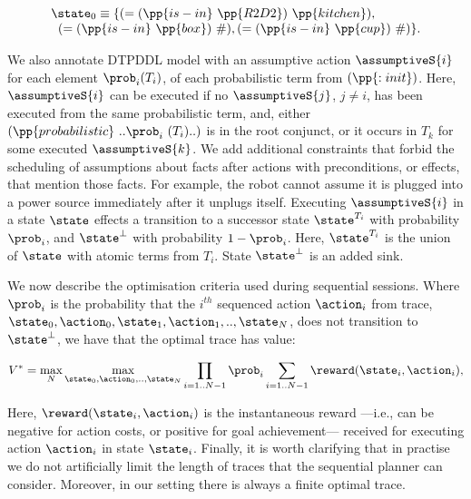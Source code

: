 \small
\[
\begin{array}{l}
\state_0 \equiv \{(=(\pp{is-in}~\pp{R2D2})~\pp{kitchen}),\\
\;\;(=(\pp{is-in}~\pp{box})~\#), (=(\pp{is-in}~\pp{cup})~\#)\}.
\end{array}
\]
\normalsize

We also annotate DTPDDL model with an assumptive action
$\assumptiveS{i}$ for each element $\prob_i (T_i)$, of each
probabilistic term from $(\pp{:init})$. Here, $\assumptiveS{i}$ can be
executed if no $\assumptiveS{j}$, $j \neq i$, has been executed from
the same probabilistic term, and, either
$(\pp{probabilistic}~..\prob_i~(T_i)..)$ is in the root conjunct, or
it occurs in $T_k$ for some executed $\assumptiveS{k}$. 
We add additional constraints that forbid the scheduling of
assumptions about facts after actions with preconditions, or effects,
that mention those facts. For example, the robot cannot assume it is
plugged into a power source immediately after it unplugs itself.
Executing $\assumptiveS{i}$ in a state $\state$ effects a transition
to a successor state $\state^{T_i}$ with probability $\prob_i$, and
$\state^\bot$ with probability $1 - \prob_i$. Here, $\state^{T_i}$ is
the union of $\state$ with atomic terms from $T_i$. State
$\state^\bot$ is an added sink.


We now describe the optimisation criteria used during sequential
sessions. Where $\prob_i$ is the probability that the $i^{th}$
sequenced action $\action_i$ from trace,
$\state_0, \action_0,\state_1, \action_1,.., \state_N$, does not
transition to $\state^\bot$, we have that the optimal trace has value:




\small
\[
V^* = \max_N \max_{\state_0, \action_0,.., \state_N} \prod_{i=1..N-1} \prob_i \sum_{i=1..N-1}
\reward(\state_i, \action_i),
\]
\normalsize

\noindent  Here,  $\reward(\state_i, \action_i)$ is the instantaneous
reward ---i.e., can be negative for action costs, or positive for goal
achievement--- received for executing action $\action_i$ in state
$\state_i$. Finally, it is worth clarifying that in practise we do not
artificially limit the length of traces that the sequential planner
can consider. Moreover, in our setting there is always a finite
optimal trace.


